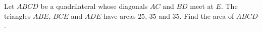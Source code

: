 Let $ABCD$ be a quadrilateral whose diagonals $AC$ and $BD$ meet at $E$. The triangles $ABE$, $BCE$ and $ADE$ have areas $25$, $35$ and $35$. Find the area of $ABCD$.
